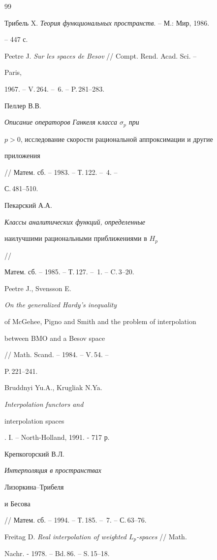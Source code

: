  


\begin{thebibliography}{99} 


 




Трибель X. {\em Теория функциональных пространств}. -- М.: Мир, 1986. 


-- 447 с. 




Peetre J. {\em Sur les spaces de Besov} // Compt. Rend. Acad. Sci. -- 


Paris, 


1967. -- V.\,264. -- \No\,6. -- P.\,281--283. 




Пеллер В.В. {\em Описание операторов Ганкеля класса $\sigma_p$ при 


$p>0$, исследование скорости рациональной аппроксимации и другие 


приложения} // Матем. сб. -- 1983. -- Т.\,122. -- \No\,4. -- 


С.\,481--510.  




Пекарский А.А. {\em Классы аналитических функций, определенные 


наилучшими рациональными приближениями в $H_p$} // 


Матем. сб. -- 1985. -- Т.\,127. -- \No\,1. -- C.\,3--20. 




Peetre J., Svensson E. {\em On the generalized Hardy's inequality 


of McGehee, Pigno and Smith and the problem of interpolation 


between BMO and a Besov space} // Math. Scand. -- 1984. -- V.\,54. --  


P.\,221--241. 




Bruddnyi Yu.A., Krugliak N.Ya. {\em Interpolation functors and 


interpolation spaces}. I. -- North-Holland, 1991. - 717 р. 




Крепкогорский В.Л. {\em Интерполяция в пространствах 


Лизоркина--Трибеля 


и Бесова} // Матем. сб. -- 1994. -- Т.\,185. -- \No\,7. -- С.\,63--76. 




Freitag D. {\em Real interpolation of weighted $L_p$-spaces} // Math. 


Nachr. - 1978. -- Bd.\,86. -- S.\,15--18. 


 


\end{thebibliography} 


 


\vskip 2cm 


 






 


\label{end} 


 


 


